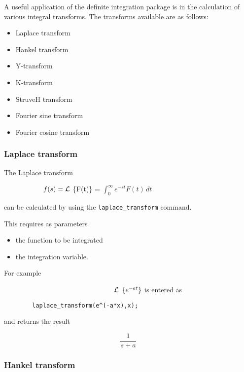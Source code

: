 A useful application of the definite integration package is in the 
calculation of various integral transforms. The transforms
available are as follows:

\begin{itemize}
\item Laplace transform 
\item Hankel transform 
\item Y-transform 
\item K-transform 
\item StruveH transform 
\item Fourier sine transform
\item Fourier cosine transform 
\end{itemize}

\subsubsection{Laplace transform}

The Laplace transform

$\hspace{20 mm} f(s) = \cal L$ \{F(t)\} =
$\int_{0}^{\infty} e^{-st}F(t)\,dt$

can be calculated by using the \verb+laplace_transform+ command.

This requires as parameters

\begin{itemize}
\item the function to be integrated
\item the integration variable.
\end{itemize}

For example

$\hspace{56 mm} \cal L$ $\{e^{-at}\} \\$
is entered as

\begin{verbatim}
        laplace_transform(e^(-a*x),x);
\end{verbatim}

and returns the result
 
\begin{displaymath}
\frac{1}{s+a}
\end{displaymath}

\subsubsection{Hankel transform}

